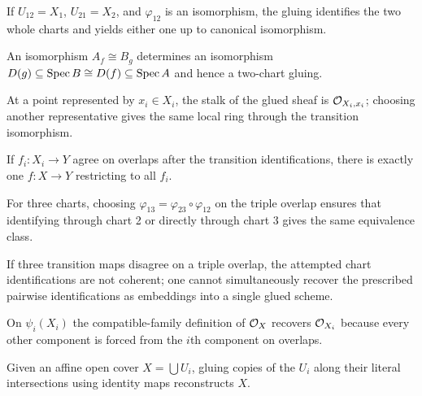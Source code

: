 \begin{example}
If $U_{12}=X_1$, $U_{21}=X_2$, and $\varphi_{12}$ is an isomorphism, the gluing identifies the two whole charts and yields either one up to canonical isomorphism.
\end{example}

\begin{example}
An isomorphism $A_f\cong B_g$ determines an isomorphism $D(g)\subseteq\operatorname{Spec} B\cong D(f)\subseteq\operatorname{Spec} A$ and hence a two-chart gluing.
\end{example}

\begin{example}
At a point represented by $x_i\in X_i$, the stalk of the glued sheaf is $\mathcal O_{X_i,x_i}$; choosing another representative gives the same local ring through the transition isomorphism.
\end{example}

\begin{example}
If $f_i:X_i\to Y$ agree on overlaps after the transition identifications, there is exactly one $f:X\to Y$ restricting to all $f_i$.
\end{example}

\begin{example}
For three charts, choosing $\varphi_{13}=\varphi_{23}\circ\varphi_{12}$ on the triple overlap ensures that identifying through chart 2 or directly through chart 3 gives the same equivalence class.
\end{example}

\begin{example}
If three transition maps disagree on a triple overlap, the attempted chart identifications are not coherent; one cannot simultaneously recover the prescribed pairwise identifications as embeddings into a single glued scheme.
\end{example}

\begin{example}
On $\psi_i(X_i)$ the compatible-family definition of $\mathcal O_X$ recovers $\mathcal O_{X_i}$ because every other component is forced from the $i$th component on overlaps.
\end{example}

\begin{example}
Given an affine open cover $X=\bigcup U_i$, gluing copies of the $U_i$ along their literal intersections using identity maps reconstructs $X$.
\end{example}

